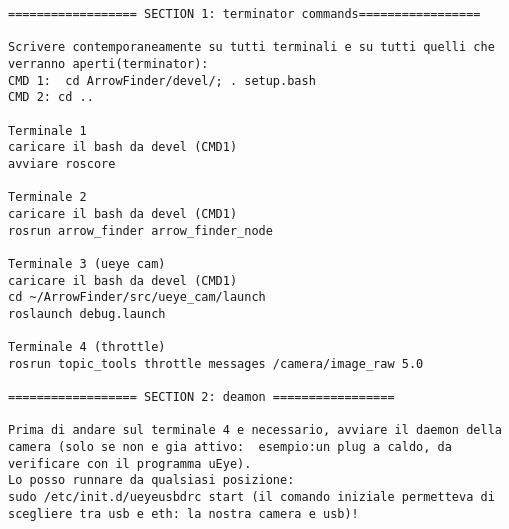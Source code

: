 \begin{lstlisting}
================== SECTION 1: terminator commands=================

Scrivere contemporaneamente su tutti terminali e su tutti quelli che verranno aperti(terminator):
CMD 1:  cd ArrowFinder/devel/; . setup.bash
CMD 2: cd ..

Terminale 1 
caricare il bash da devel (CMD1)
avviare roscore

Terminale 2
caricare il bash da devel (CMD1)
rosrun arrow_finder arrow_finder_node

Terminale 3 (ueye cam)
caricare il bash da devel (CMD1)
cd ~/ArrowFinder/src/ueye_cam/launch
roslaunch debug.launch 

Terminale 4 (throttle)
rosrun topic_tools throttle messages /camera/image_raw 5.0 

================== SECTION 2: deamon =================

Prima di andare sul terminale 4 e necessario, avviare il daemon della camera (solo se non e gia attivo:  esempio:un plug a caldo, da verificare con il programma uEye).
Lo posso runnare da qualsiasi posizione:
sudo /etc/init.d/ueyeusbdrc start (il comando iniziale permetteva di scegliere tra usb e eth: la nostra camera e usb)!
\end{lstlisting}